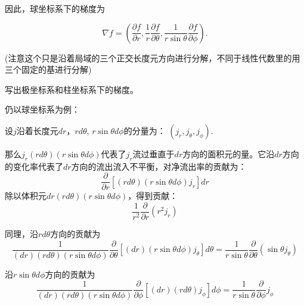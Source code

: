 \documentclass[CJK]{beamer}
\begin{document}
\begin{frame}
  \bch

  因此，球坐标系下的梯度为

  $$\nabla f = \left(\frac{\partial f}{\partial r}, \frac{1}{r}\frac{\partial f}{\partial \theta}, \frac{1}{r\sin\theta}\frac{\partial f}{\partial \phi} \right).$$

  \skiplines
  
  (注意这个只是沿着局域的三个正交长度元方向进行分解，不同于线性代数里的用三个固定的基进行分解)
  \ech
\end{frame}



\begin{frame}
\bch


写出极坐标系和柱坐标系下的梯度。

\ech
\end{frame}



\begin{frame}
  \bch

仍以球坐标系为例：

  设$j$沿着长度元$dr$，$rd\theta$, $r\sin\theta d\phi$的分量为：
  $(j_r, j_\theta, j_\phi).$

  那么$j_r(rd\theta)(r\sin\theta d\phi)$代表了$j_r$流过垂直于$dr$方向的面积元的量。它沿$dr$方向的变化率代表了$dr$方向的流出流入不平衡，对净流出率的贡献为：
  $$\frac{\partial }{\partial r} \left[(rd\theta)(r\sin\theta d\phi)j_r\right]dr$$
  除以体积元$dr (rd\theta)(r\sin\theta d\phi)$，得到贡献：
  $$\frac{1}{r^2}\frac{\partial }{\partial r} \left(r^2j_r\right)$$  
  \ech
\end{frame}


\begin{frame}
  \bch

  同理，沿$rd \theta$方向的贡献为
 $$\frac{1}{(dr) (rd\theta) (r\sin\theta d\phi)}\frac{\partial }{\partial \theta} \left[(dr)(r\sin\theta d\phi)j_\theta\right] d\theta  = \frac{1}{r\sin\theta}\frac{\partial  }{\partial \theta} \left( \sin\theta j_\theta\right) $$

  沿$r\sin\theta d\phi$方向的贡献为
  $$\frac{1}{(dr) (rd\theta) (r\sin\theta d\phi)}\frac{\partial }{\partial \phi} \left[(dr)(rd\theta)j_\phi\right] d\phi = \frac{1}{r\sin\theta}\frac{\partial  }{\partial \phi} j_\phi $$
  
  \ech
\end{frame}
\end{document}
